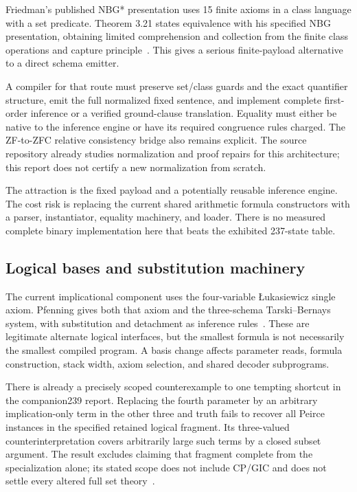 Friedman's published NBG* presentation uses 15 finite axioms in a class
language with a set predicate.  Theorem 3.21 states equivalence with his
specified NBG presentation, obtaining limited comprehension and collection
from the finite class operations and capture principle~\cite{nbg}.
This gives a serious finite-payload alternative to a direct schema emitter.

A compiler for that route must preserve set/class guards and the exact
quantifier structure, emit the full normalized fixed sentence, and
implement complete first-order inference or a verified ground-clause
translation.  Equality must either be native to the inference engine or
have its required congruence rules charged.  The ZF-to-ZFC relative
consistency bridge also remains explicit.  The source repository already
studies normalization and proof repairs for this architecture; this
report does not certify a new normalization from scratch.

The attraction is the fixed payload and a potentially reusable inference
engine.  The cost risk is replacing the current shared arithmetic formula
constructors with a parser, instantiator, equality machinery, and loader.
There is no measured complete binary implementation here that beats the
exhibited 237-state table.

\subsection{Logical bases and substitution machinery}

The current implicational component uses the four-variable
\L ukasiewicz single axiom.  Pfenning gives both that axiom and the
three-schema Tarski--Bernays system, with substitution and detachment
as inference rules~\cite{pfenning}.  These are legitimate alternate
logical interfaces, but the smallest formula is not necessarily the
smallest compiled program.  A basis change affects parameter reads,
formula construction, stack width, axiom selection, and shared decoder
subprograms.

There is already a precisely scoped counterexample to one tempting
shortcut in the companion239 report.  Replacing the fourth parameter by
an arbitrary implication-only term in the other three and truth fails
to recover all Peirce instances in the specified retained logical
fragment.  Its three-valued counterinterpretation covers arbitrarily
large such terms by a closed subset argument.  The result excludes
claiming that fragment complete from the specialization alone; its
stated scope does not include CP/GIC and does not settle every altered
full set theory~\cite{coordinated239}.

